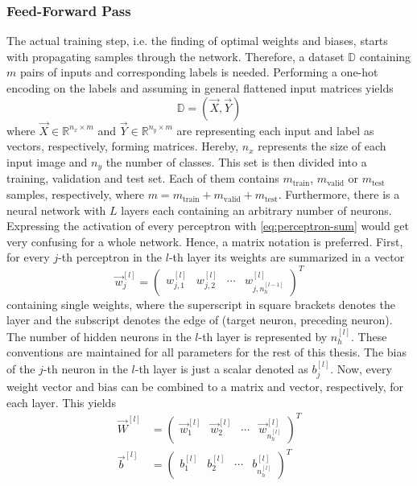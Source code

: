 \subsubsection{Feed-Forward Pass}
\label{sec:training-forward-pass}
The actual training step, i.e. the finding of optimal weights and biases, starts with propagating samples through the network.
Therefore, a dataset $\mathbb{D}$ containing $m$ pairs of inputs and corresponding labels is needed.
Performing a one-hot encoding on the labels and assuming in general flattened input matrices yields
\begin{equation}
	\label{eq:dataset-one-hot}
	\mathbb{D} = \left( \vec{X} , \vec{Y} \right)
\end{equation}
where $\vec{X} \in \mathbb{R}^{n_x \times m}$ and $\vec{Y} \in \mathbb{R}^{n_y \times m}$ are representing each input and label as vectors, respectively, forming matrices.
Hereby, $n_x$ represents the size of each input image and $n_y$ the number of classes.
This set is then divided into a training, validation and test set.
Each of them contains $m_{\text{train}}$, $m_{\text{valid}}$ or $m_{\text{test}}$ samples, respectively, where $m = m_{\text{train}} + m_{\text{valid}} + m_{\text{test}}$.
Furthermore, there is a neural network with $L$ layers each containing an arbitrary number of neurons.
Expressing the activation of every perceptron with \eqref{eq:perceptron-sum} would get very confusing for a whole network.
Hence, a matrix notation is preferred.
First, for every $j$-th perceptron in the $l$-th layer its weights are summarized in a vector
\begin{equation}
	\label{eq:weights-vector}
	\vec{w}^{[l]}_j =
	\begin{pmatrix}
		w^{[l]}_{j,1} & w^{[l]}_{j,2} & \cdots & w^{[l]}_{j,n^{[l-1]}_h}
	\end{pmatrix}^T
\end{equation}
containing single weights, where the superscript in square brackets denotes the layer and the subscript denotes the edge of (target neuron, preceding neuron).
The number of hidden neurons in the $l$-th layer is represented by $n^{[l]}_h$.
These conventions are maintained for all parameters for the rest of this thesis.
The bias of the $j$-th neuron in the $l$-th layer is just a scalar denoted as $b^{[l]}_j$. 
Now, every weight vector and bias can be combined to a matrix and vector, respectively, for each layer.
This yields
\begin{subequations}
\label{eq:parameters}
	\begin{align}
		\vec{W}^{[l]} &=
		\begin{pmatrix}
			\vec{w}^{[l]}_1 & \vec{w}^{[l]}_2 & \cdots & \vec{w}^{[l]}_{n^{[l]}_h}
		\end{pmatrix}^T
		\label{eq:weights}
		\\
		\vec{b}^{[l]} &=
			\begin{pmatrix}
				b^{[l]}_1 & b^{[l]}_2 & \cdots & b^{[l]}_{n^{[l]}_h}
			\end{pmatrix}^T
		\label{eq:biases}
	\end{align}
\end{subequations}
